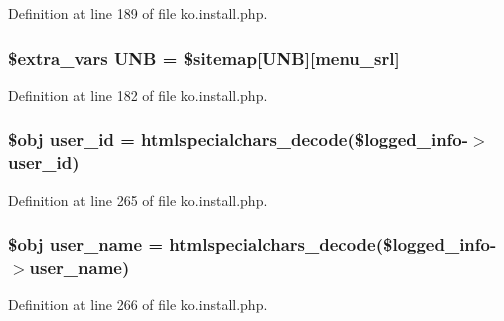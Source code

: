 Definition at line 189 of file ko.\+install.\+php.

\subsubsection[{\texorpdfstring{U\+NB}{UNB}}]{\setlength{\rightskip}{0pt plus 5cm}\${\bf extra\+\_\+vars} U\+NB = \$sitemap\mbox{[}\textquotesingle{}U\+NB\textquotesingle{}\mbox{]}\mbox{[}\textquotesingle{}menu\+\_\+srl\textquotesingle{}\mbox{]}}\hypertarget{ko_8install_8php_abc0cb1f57d83d4a106f4495c30e0df52}{}\label{ko_8install_8php_abc0cb1f57d83d4a106f4495c30e0df52}


Definition at line 182 of file ko.\+install.\+php.

\subsubsection[{\texorpdfstring{user\+\_\+id}{user_id}}]{\setlength{\rightskip}{0pt plus 5cm}\$obj user\+\_\+id = htmlspecialchars\+\_\+decode(\$logged\+\_\+info-\/$>$user\+\_\+id)}\hypertarget{ko_8install_8php_a74f1a394389d774e5b4cd5d1d15413f7}{}\label{ko_8install_8php_a74f1a394389d774e5b4cd5d1d15413f7}


Definition at line 265 of file ko.\+install.\+php.

\subsubsection[{\texorpdfstring{user\+\_\+name}{user_name}}]{\setlength{\rightskip}{0pt plus 5cm}\$obj user\+\_\+name = htmlspecialchars\+\_\+decode(\$logged\+\_\+info-\/$>$user\+\_\+name)}\hypertarget{ko_8install_8php_a115401aff7da80e73c66e9f76505426b}{}\label{ko_8install_8php_a115401aff7da80e73c66e9f76505426b}


Definition at line 266 of file ko.\+install.\+php.

